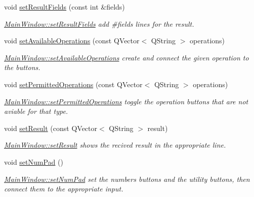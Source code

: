 \begin{DoxyCompactItemize}
void \hyperlink{class_main_window_ae00d4afec436d34430e43dcc6742b875}{set\+Result\+Fields} (const int \&fields)
\begin{DoxyCompactList}\small\item\em \hyperlink{class_main_window_ae00d4afec436d34430e43dcc6742b875}{Main\+Window\+::set\+Result\+Fields} add \#fields lines for the result. \end{DoxyCompactList}\item 
void \hyperlink{class_main_window_a282ffcc1cb28b83d4f8fe510f6b2e42e}{set\+Available\+Operations} (const Q\+Vector$<$ Q\+String $>$ operations)
\begin{DoxyCompactList}\small\item\em \hyperlink{class_main_window_a282ffcc1cb28b83d4f8fe510f6b2e42e}{Main\+Window\+::set\+Available\+Operations} create and connect the given operation to the buttons. \end{DoxyCompactList}\item 
void \hyperlink{class_main_window_a86f711960ec362153b5d2ef6667c6c0c}{set\+Permitted\+Operations} (const Q\+Vector$<$ Q\+String $>$ operations)
\begin{DoxyCompactList}\small\item\em \hyperlink{class_main_window_a86f711960ec362153b5d2ef6667c6c0c}{Main\+Window\+::set\+Permitted\+Operations} toggle the operation buttons that are not aviable for that type. \end{DoxyCompactList}\item 
void \hyperlink{class_main_window_a04fa84f042da5f258d1dc09803667bbf}{set\+Result} (const Q\+Vector$<$ Q\+String $>$ result)
\begin{DoxyCompactList}\small\item\em \hyperlink{class_main_window_a04fa84f042da5f258d1dc09803667bbf}{Main\+Window\+::set\+Result} shows the recived result in the appropriate line. \end{DoxyCompactList}\item 
\mbox{\label{class_main_window_aa16f2c84e4ddda0e0544e1e189b3bc62}} 
void \hyperlink{class_main_window_aa16f2c84e4ddda0e0544e1e189b3bc62}{set\+Num\+Pad} ()
\begin{DoxyCompactList}\small\item\em \hyperlink{class_main_window_aa16f2c84e4ddda0e0544e1e189b3bc62}{Main\+Window\+::set\+Num\+Pad} set the numbers buttons and the utility buttons, then connect them to the appropriate input. \end{DoxyCompactList}\item 

\end{DoxyCompactItemize}
